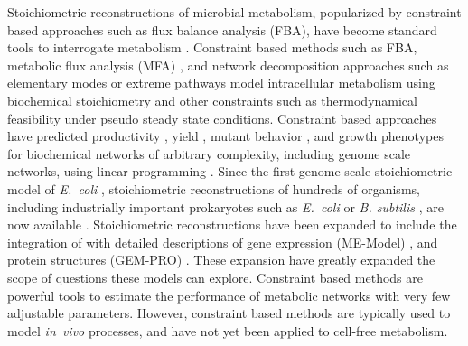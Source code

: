 \documentclass[journal=asbcd6,manuscript=article]{achemso}
\begin{document}
Stoichiometric reconstructions of microbial metabolism, popularized by constraint based approaches such as flux balance analysis (FBA), have become standard tools to interrogate metabolism \cite{2012_lewis_palsson_NatRevMicrobio}.
Constraint based methods such as FBA, metabolic flux analysis (MFA) \cite{WIECHERT2001195}, and network decomposition approaches such as elementary modes \cite{Schuster:2000aa} or extreme pathways \cite{Schilling:2000aa} model intracellular metabolism using biochemical stoichiometry and other constraints such as thermodynamical feasibility \cite{Henry:2007,Hamilton:2013} under pseudo steady state conditions.
Constraint based approaches have predicted productivity \cite{Varma01101994, BTPR:BTPR2132}, yield \cite{Varma01101994}, mutant behavior \cite{Edwards2000}, and growth phenotypes \cite{Brien693} for biochemical networks of arbitrary complexity, including genome scale networks, using linear programming \cite{Covert:2004aa}.
Since the first genome scale stoichiometric model of \textit{E.~coli} \cite{2000_edwards_palsson_PNAS}, stoichiometric reconstructions of hundreds of organisms, including industrially important prokaryotes such as \textit{E.~coli} \cite{Feist:2007aa} or \textit{B. subtilis} \cite{Oh:2007aa}, are now available \cite{2009_feist_palsson_NatRevMicrobio}.
Stoichiometric reconstructions have been expanded to include the integration of with detailed descriptions of gene expression (ME-Model) \cite{Allen:2003aa, Brien693},
and protein structures (GEM-PRO) \cite{Zhang1544,Chang1220}.
These expansion have greatly expanded the scope of questions these models can explore.
Constraint based methods are powerful tools to estimate the performance of metabolic networks with very few adjustable parameters.
However, constraint based methods are typically used to model \textit{in~vivo} processes, and have not yet been applied to cell-free metabolism.
\end{document}
